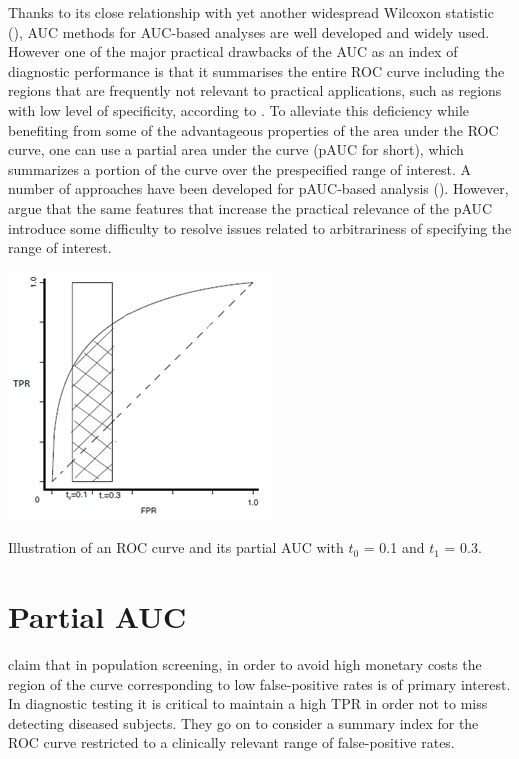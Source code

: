 Thanks to its close relationship with yet another widespread Wilcoxon statistic (\citep{hanley1982useauc}), AUC methods for AUC-based analyses are well developed and widely used. However one of the major practical drawbacks of the AUC as an index of diagnostic performance is that it summarises the entire ROC curve including the regions that are frequently not relevant to practical applications, such as regions with low level of specificity, according to \citet{ma2013paucdiagperf}. To alleviate this deficiency while benefiting from some of the advantageous properties of the area under the ROC curve, one can use a partial area under the curve (pAUC for short), which summarizes a portion of the curve over the prespecified range of interest. A number of approaches have been developed for pAUC-based analysis (\citep{dodd2003pauc,he2010nonparagenomic,mcclish1989paucanal,zhang2002nonparpaucapp}). However, \citet{ma2013paucdiagperf} argue that the same features that increase the practical relevance of the pAUC introduce some difficulty to resolve issues related to arbitrariness of specifying the range of interest. 

\begin{marginfigure}
	\includegraphics{roc_curves/Figure4.png}
	\caption{Illustration of an ROC curve and its partial AUC with $t_{0}$ = 0.1 and $t_{1}$ = 0.3.}
	\label{fig:partial-auc}
\end{marginfigure}

\section{Partial AUC} 
\citet{dodd2003pauc} claim that in population screening, in order to avoid high monetary costs the region of the curve corresponding to low false-positive rates is of primary interest. In diagnostic testing it is critical to maintain a high TPR in order not to miss detecting diseased subjects. They go on to consider a summary index for the ROC curve restricted to a clinically relevant range of false-positive rates.

